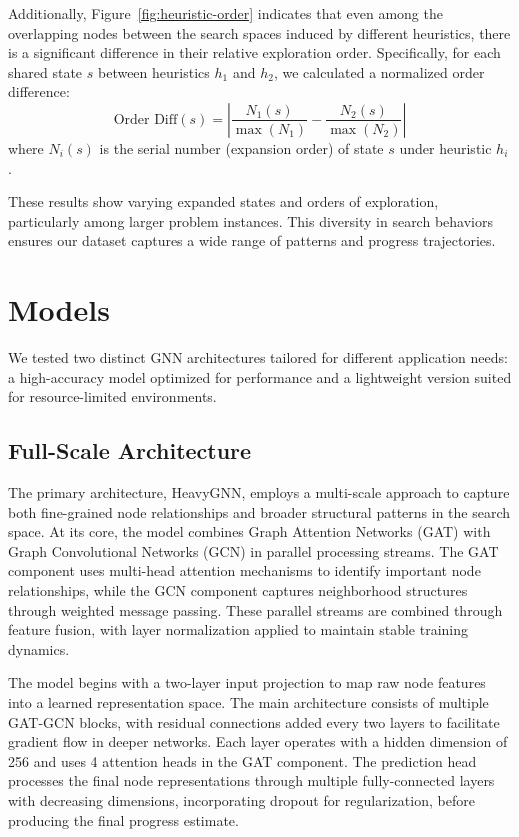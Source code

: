 \documentclass[letterpaper]{article}
\begin{document}
Additionally, Figure~\ref{fig:heuristic-order} indicates that even among the overlapping nodes between the search spaces induced by different heuristics, there is a significant difference in their relative exploration order. Specifically, for each shared state $s$ between heuristics $h_1$ and $h_2$, we calculated a normalized order difference:
\begin{equation}\label{eq:order-diff}
    \text{Order Diff}(s) = \left|\frac{N_1(s)}{\max(N_1)} - \frac{N_2(s)}{\max(N_2)}\right|
\end{equation}
where $N_i(s)$ is the serial number (expansion order) of state $s$ under heuristic $h_i$.

These results show varying expanded states and orders of exploration, particularly among larger problem instances. This diversity in search behaviors ensures our dataset captures a wide range of patterns and progress trajectories.

\section{Models} \label{sec:models}

We tested two distinct GNN architectures tailored for different application needs: a high-accuracy model optimized for performance and a lightweight version suited for resource-limited environments.

\subsection{Full-Scale Architecture}

The primary architecture, HeavyGNN, employs a multi-scale approach to capture both fine-grained node relationships and broader structural patterns in the search space. At its core, the model combines Graph Attention Networks (GAT) with Graph Convolutional Networks (GCN) in parallel processing streams. The GAT component uses multi-head attention mechanisms to identify important node relationships, while the GCN component captures neighborhood structures through weighted message passing. These parallel streams are combined through feature fusion, with layer normalization applied to maintain stable training dynamics.

The model begins with a two-layer input projection to map raw node features into a learned representation space. The main architecture consists of multiple GAT-GCN blocks, with residual connections added every two layers to facilitate gradient flow in deeper networks. Each layer operates with a hidden dimension of 256 and uses 4 attention heads in the GAT component. The prediction head processes the final node representations through multiple fully-connected layers with decreasing dimensions, incorporating dropout for regularization, before producing the final progress estimate.
\end{document}
